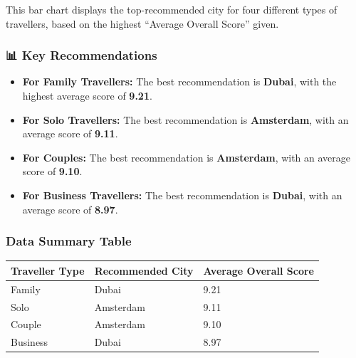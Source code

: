 \documentclass[
  letterpaper,
  DIV=11,
  numbers=noendperiod]{scrartcl}
\providecommand{\tightlist}{%
  \setlength{\itemsep}{0pt}\setlength{\parskip}{0pt}}
\begin{document}
This bar chart displays the top-recommended city for four different
types of travellers, based on the highest ``Average Overall Score''
given.

\subsubsection{📊 Key Recommendations}\label{key-recommendations}

\begin{itemize}
\tightlist
\item
  \textbf{For Family Travellers:} The best recommendation is
  \textbf{Dubai}, with the highest average score of \textbf{9.21}.
\item
  \textbf{For Solo Travellers:} The best recommendation is
  \textbf{Amsterdam}, with an average score of \textbf{9.11}.
\item
  \textbf{For Couples:} The best recommendation is \textbf{Amsterdam},
  with an average score of \textbf{9.10}.
\item
  \textbf{For Business Travellers:} The best recommendation is
  \textbf{Dubai}, with an average score of \textbf{8.97}.
\end{itemize}

\subsubsection{Data Summary Table}\label{data-summary-table}

\begin{longtable}[]{@{}lll@{}}
\toprule\noalign{}
Traveller Type & Recommended City & Average Overall Score \\
\midrule\noalign{}
\endhead
\bottomrule\noalign{}
\endlastfoot
Family & Dubai & 9.21 \\
Solo & Amsterdam & 9.11 \\
Couple & Amsterdam & 9.10 \\
Business & Dubai & 8.97 \\
\end{longtable}
\end{document}
